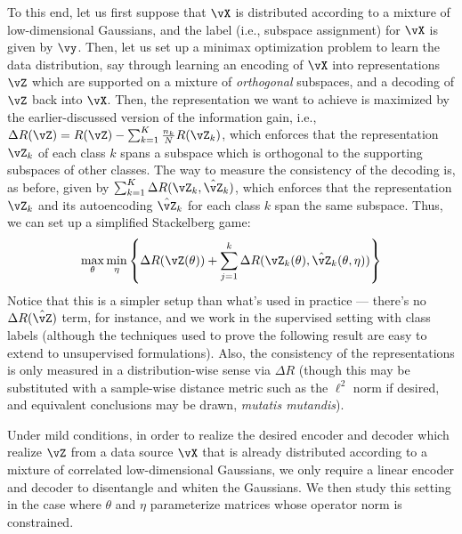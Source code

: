 \documentclass[../../book-main.tex]{subfiles}
\begin{document}
To this end, let us first suppose that \(\vX\) is distributed according to a mixture of low-dimensional Gaussians, and the label (i.e., subspace assignment) for \(\vX\) is given by \(\vy\). Then, let us set up a minimax optimization problem to learn the data distribution, say through learning an encoding of \(\vX\) into representations \(\vZ\) which are supported on a mixture of \textit{orthogonal} subspaces, and a decoding of \(\vZ\) back into \(\vX\). Then, the representation we want to achieve is maximized by the earlier-discussed version of the information gain, i.e., \(\Delta R(\vZ) = R(\vZ) - \sum_{k = 1}^{K}\frac{n_{k}}{N}R(\vZ_{k})\), which enforces that the representation \(\vZ_{k}\) of each class \(k\) spans a subspace which is orthogonal to the supporting subspaces of other classes. The way to measure the consistency of the decoding is, as before, given by \(\sum_{k = 1}^{K}\Delta R(\vZ_{k}, \hat{\vZ}_{k})\), which enforces that the representation \(\vZ_{k}\) and its autoencoding \(\hat{\vZ}_{k}\) for each class \(k\) span the same subspace. Thus, we can set up a simplified Stackelberg game:
\begin{equation}\label{eq:ctrl_msp_game}
    \max_{\theta}\min_{\eta}\bc{\Delta R(\vZ(\theta)) + \sum_{j = 1}^{k}\Delta R(\vZ_{k}(\theta), \hat{\vZ}_{k}(\theta, \eta))}
\end{equation}
Notice that this is a simpler setup than what's used in practice --- there's no \(\Delta R(\hat{\vZ})\) term, for instance, and we work in the supervised setting with class labels (although the techniques used to prove the following result are easy to extend to unsupervised formulations). Also, the consistency of the representations is only measured in a distribution-wise sense via \(\Delta R\) (though this may be substituted with a sample-wise distance metric such as the \(\ell^{2}\) norm if desired, and equivalent conclusions may be drawn, \textit{mutatis mutandis}).

Under mild conditions, in order to realize the desired encoder and decoder which realize \(\vZ\) from a data source \(\vX\) that is already distributed according to a mixture of correlated low-dimensional Gaussians, we only require a linear encoder and decoder to disentangle and whiten the Gaussians. We then study this setting in the case where \(\theta\) and \(\eta\) parameterize matrices whose operator norm is constrained. 
\end{document}
